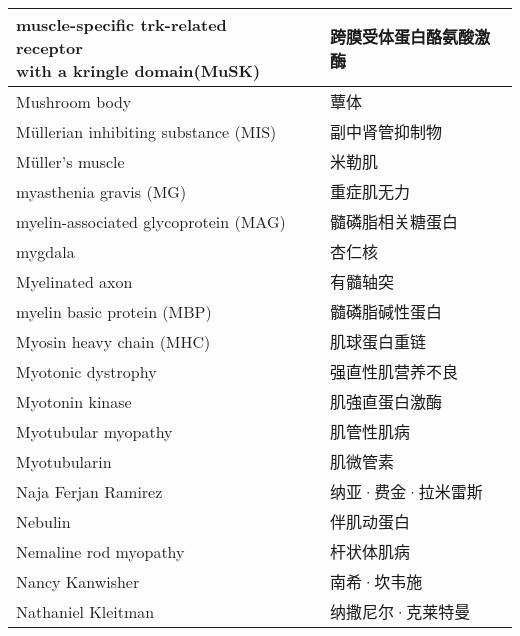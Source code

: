 \begin{longtable}{lll}
	\midrule
	\makecell[l]{muscle-specific trk-related receptor \\with a kringle domain(MuSK)}   && 跨膜受体蛋白酪氨酸激酶  \\
	
	\midrule
	Mushroom body   && 蕈体  \\
	
	\midrule
	Müllerian inhibiting substance (MIS)   && 副中肾管抑制物  \\
	
	\midrule
	Müller's muscle   && 米勒肌  \\
	
	\midrule
	myasthenia gravis (MG)    && 重症肌无力   \\
	
	\midrule
	myelin-associated glycoprotein (MAG)     && 髓磷脂相关糖蛋白   \\
	
	\midrule
	mygdala     && 杏仁核   \\
	
	\midrule
	Myelinated axon     && 有髓轴突   \\
	
	\midrule
	myelin basic protein (MBP)     && 髓磷脂碱性蛋白   \\
	
	\midrule
	Myosin heavy chain (MHC)    && 肌球蛋白重链   \\
	
	\midrule
	Myotonic dystrophy    && 强直性肌营养不良   \\
	
	\midrule
	Myotonin kinase    && 肌強直蛋白激酶   \\
	
	\midrule
	Myotubular myopathy    && 肌管性肌病   \\
	
	\midrule
	Myotubularin    && 肌微管素   \\
	
	\midrule
	Naja Ferjan Ramirez   &&  纳亚·费金·拉米雷斯 \\
	
	\midrule
	Nebulin   &&  伴肌动蛋白 \\
	
	\midrule
	Nemaline rod myopathy   &&  杆状体肌病 \\
	
	\midrule
	Nancy Kanwisher   &&  南希·坎韦施 \\
	
	\midrule
	Nathaniel Kleitman   &&  纳撒尼尔·克莱特曼 \\
	

\end{longtable}
